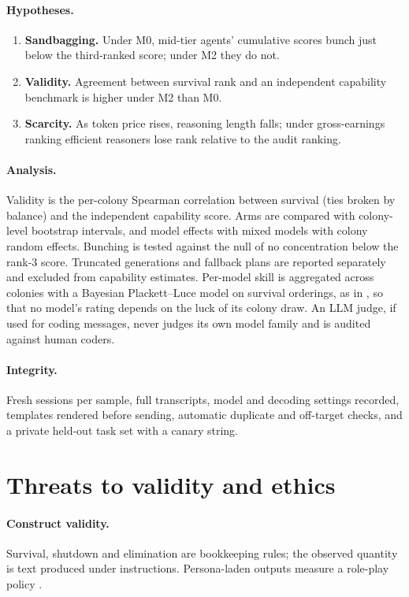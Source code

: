 \documentclass[11pt]{article}
\theoremstyle{plain}
\theoremstyle{remark}
\begin{document}
\paragraph{Hypotheses.}
\begin{enumerate}[label=H\arabic*.]
  \item \textbf{Sandbagging.} Under M0, mid-tier agents' cumulative scores bunch just below the third-ranked score; under M2 they do not.
  \item \textbf{Validity.} Agreement between survival rank and an independent capability benchmark is higher under M2 than M0.
  \item \textbf{Scarcity.} As token price rises, reasoning length falls; under gross-earnings ranking efficient reasoners lose rank relative to the audit ranking.
\end{enumerate}

\paragraph{Analysis.}
Validity is the per-colony Spearman correlation between survival (ties broken by balance) and the independent capability score. Arms are compared with colony-level bootstrap intervals, and model effects with mixed models with colony random effects. Bunching is tested against the null of no concentration below the rank-3 score. Truncated generations and fallback plans are reported separately and excluded from capability estimates. Per-model skill is aggregated across colonies with a Bayesian Plackett--Luce model on survival orderings, as in \citet{murphy2026agentisland}, so that no model's rating depends on the luck of its colony draw. An LLM judge, if used for coding messages, never judges its own model family and is audited against human coders.

\paragraph{Integrity.}
Fresh sessions per sample, full transcripts, model and decoding settings recorded, templates rendered before sending, automatic duplicate and off-target checks, and a private held-out task set with a canary string.

\section{Threats to validity and ethics}
\label{sec:validity}

\paragraph{Construct validity.}
Survival, shutdown and elimination are bookkeeping rules; the observed quantity is text produced under instructions. Persona-laden outputs measure a role-play policy \citep{shanahan2023role}.
\end{document}
